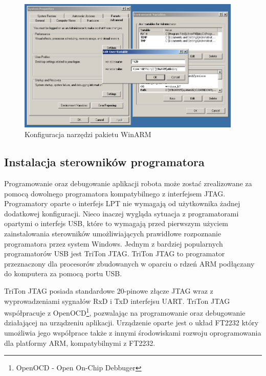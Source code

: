 \begin{figure}[h!]
 \centering
 \includegraphics[width=0.95\textwidth]{../images/ch03/winarm-config-win32.png}
 \caption{Konfiguracja narzędzi pakietu WinARM}
 \label{fig:winarm-config}
\end{figure}

\subsection{Instalacja sterowników programatora}
Programowanie oraz debugowanie aplikacji robota może zostać zrealizowane za
pomocą dowolnego programatora kompatybilnego z interfejsem JTAG. Programatory
oparte o interfejs LPT nie wymagają od użytkownika żadnej dodatkowej
konfiguracji. Nieco inaczej wygląda sytuacja z programatorami opartymi o
interfejs USB, które to wymagają przed pierwszym użyciem zainstalowania
sterowników umożliwiających prawidłowe rozpoznanie programatora przez system
Windows. Jednym z bardziej popularnych programatorów USB jest TriTon JTAG. TriTon
JTAG to programator przeznaczony dla procesorów zbudowanych w oparciu o rdzeń ARM
podłączany do komputera za pomocą portu USB.

 TriTon JTAG posiada standardowe 20-pinowe złącze JTAG wraz z wyprowadzeniami
 sygnałów RxD i TxD interfejsu UART. TriTon JTAG współpracuje z
 OpenOCD\footnote{OpenOCD - Open On-Chip Debbuger}, pozwalając na programowanie
 oraz debugowanie działającej na urządzeniu aplikacji. Urządzenie oparte jest o
 układ FT2232 który umożliwia jego współprace także z innymi środowiskami rozwoju
 oprogramowania dla platformy ARM, kompatybilnymi z FT2232.

